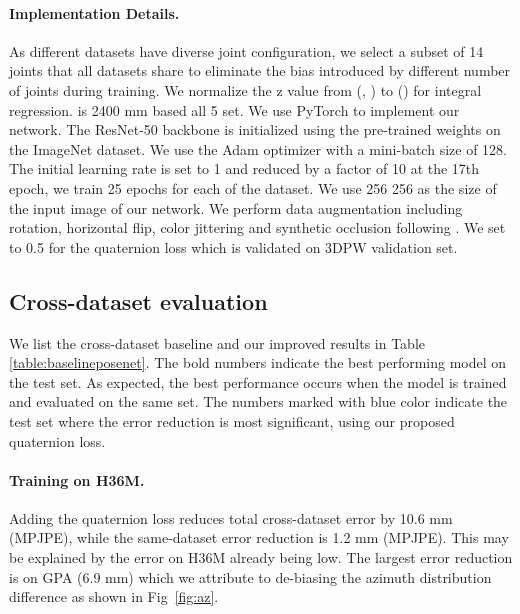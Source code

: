 \documentclass[runningheads]{llncs}
\begin{document}
\paragraph{Implementation Details.} As different datasets have diverse joint
configuration, we select a subset of 14 joints  that all datasets share to
eliminate the bias introduced by different number of joints during training.
We normalize the z value from (,
) to () for integral regression. 
is 2400 mm based all 5 set. We use PyTorch to implement our network. The
ResNet-50 \cite{resnet} backbone is initialized using the pre-trained weights
on the ImageNet dataset. We use the Adam \cite{adam} optimizer with a
mini-batch size of 128. The initial learning rate is set to 1 
 and reduced by a factor of 10 at the 17th epoch, we train 25 epochs
for each of the dataset. We use 256  256 as the size of the input image
of our network. We perform data augmentation including rotation, horizontal
flip, color jittering and synthetic occlusion following \cite{rootnet}. We set
 to 0.5 for the quaternion loss which is validated on 3DPW validation
set.





\subsection{Cross-dataset evaluation} 

We list the cross-dataset
baseline and our improved  results in Table \ref{table:baselineposenet}. The
bold numbers indicate the best performing model on the test set. As expected,
the best performance occurs when the model is trained and evaluated on the same
set. The numbers marked with blue color indicate the test set where the error
reduction is most significant, using our proposed quaternion loss.





\paragraph{Training on H36M.} Adding the quaternion loss reduces total cross-dataset
error by 10.6 mm (MPJPE), while the same-dataset error reduction is 1.2 mm (MPJPE).
This may be explained by the error on H36M already being low. The largest error reduction is on GPA  (6.9 mm) which we attribute to de-biasing the azimuth distribution difference as shown in Fig~\ref{fig:az}. 
\end{document}
